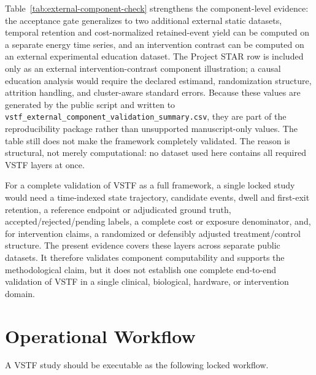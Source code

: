 \documentclass[11pt,a4paper]{article}
\newcommand{\1}{\mathbf{1}}
\begin{document}
Table~\ref{tab:external-component-check} strengthens the component-level evidence: the acceptance gate generalizes to two additional external static datasets, temporal retention and cost-normalized retained-event yield can be computed on a separate energy time series, and an intervention contrast can be computed on an external experimental education dataset. The Project STAR row is included only as an external intervention-contrast component illustration; a causal education analysis would require the declared estimand, randomization structure, attrition handling, and cluster-aware standard errors. Because these values are generated by the public script and written to \texttt{vstf\_external\_component\_validation\_summary.csv}, they are part of the reproducibility package rather than unsupported manuscript-only values. The table still does not make the framework completely validated. The reason is structural, not merely computational: no dataset used here contains all required VSTF layers at once.

For a complete validation of VSTF as a full framework, a single locked study would need a time-indexed state trajectory, candidate events, dwell and first-exit retention, a reference endpoint or adjudicated ground truth, accepted/rejected/pending labels, a complete cost or exposure denominator, and, for intervention claims, a randomized or defensibly adjusted treatment/control structure. The present evidence covers these layers across separate public datasets. It therefore validates component computability and supports the methodological claim, but it does not establish one complete end-to-end validation of VSTF in a single clinical, biological, hardware, or intervention domain.

\section{Operational Workflow}

A VSTF study should be executable as the following locked workflow.
\end{document}
